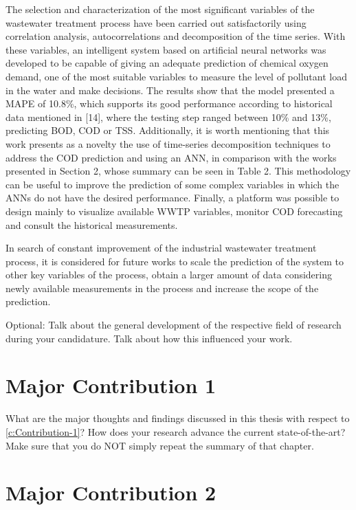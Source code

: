 The selection and characterization of the most significant variables of the wastewater treatment process have been carried out satisfactorily using correlation analysis, autocorrelations and decomposition of the time series. With these variables, an intelligent system based on artificial neural networks was developed to be capable of giving an adequate prediction of chemical oxygen demand, one of the most suitable variables to measure the level of pollutant load in the water and make decisions. The results show that the model presented a MAPE of 10.8\%, which supports its good performance according to historical data mentioned in [14], where the testing step ranged between 10\% and 13\%, predicting BOD, COD or TSS. Additionally, it is worth mentioning that this work presents as a novelty the use of time-series decomposition techniques to address the COD prediction and using an ANN, in comparison with the works presented in Section 2, whose summary can be seen in Table 2. This methodology can be useful to improve the prediction of some complex variables in which the ANNs do not have the desired performance. Finally, a platform was possible to design mainly to visualize available WWTP variables, monitor COD forecasting and consult the historical measurements. 

In search of constant improvement of the industrial wastewater treatment process, it is considered for future works to scale the prediction of the system to other key variables of the process, obtain a larger amount of data considering newly available measurements in the process and increase the scope of the prediction.


\noindent Optional: Talk about the general development of the respective field of research during your candidature. Talk about how this influenced your work.

\section{Major Contribution 1}

What are the major thoughts and findings discussed in this thesis with respect to \autoref{c:Contribution-1}? How does your research advance the current state-of-the-art? Make sure that you do NOT simply repeat the summary of that chapter.

\section{Major Contribution 2}

